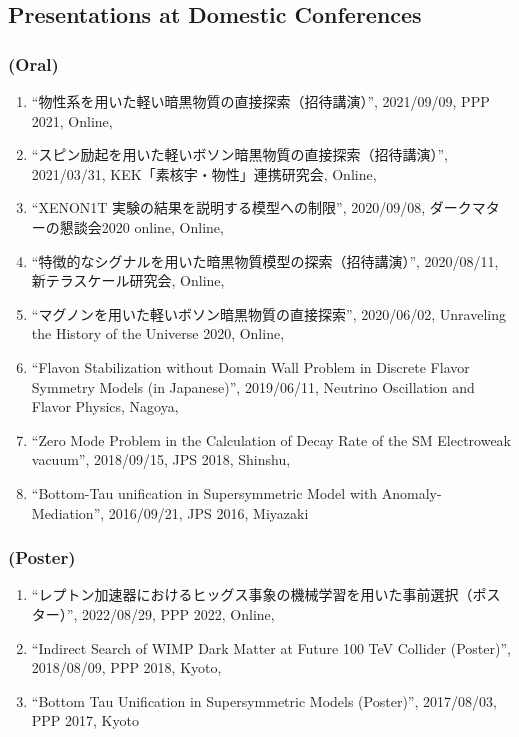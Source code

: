 \documentclass[12pt]{article}
\begin{document}
\subsection*{Presentations at Domestic Conferences}
\subsubsection*{(Oral)}
\begin{enumerate}
 \item ``物性系を用いた軽い暗黒物質の直接探索（招待講演）'', 2021/09/09, PPP 2021, Online,\item ``スピン励起を用いた軽いボソン暗黒物質の直接探索（招待講演）'', 2021/03/31, KEK「素核宇・物性」連携研究会, Online,\item ``XENON1T 実験の結果を説明する模型への制限'', 2020/09/08, ダークマターの懇談会2020 online, Online,\item ``特徴的なシグナルを用いた暗黒物質模型の探索（招待講演）'', 2020/08/11, 新テラスケール研究会, Online,\item ``マグノンを用いた軽いボソン暗黒物質の直接探索'', 2020/06/02, Unraveling the History of the Universe 2020, Online,\item ``Flavon Stabilization without Domain Wall Problem in Discrete Flavor Symmetry Models (in Japanese)'', 2019/06/11, Neutrino Oscillation and Flavor Physics, Nagoya,\item ``Zero Mode Problem in the Calculation of Decay Rate of the SM Electroweak vacuum'', 2018/09/15, JPS 2018, Shinshu,\item ``Bottom-Tau unification in Supersymmetric Model with Anomaly-Mediation'', 2016/09/21, JPS 2016, Miyazaki
\end{enumerate}
\subsubsection*{(Poster)}
\begin{enumerate}
 \item ``レプトン加速器におけるヒッグス事象の機械学習を用いた事前選択（ポスター）'', 2022/08/29, PPP 2022, Online,\item ``Indirect Search of WIMP Dark Matter at Future 100 TeV Collider (Poster)'', 2018/08/09, PPP 2018, Kyoto,\item ``Bottom Tau Unification in Supersymmetric Models (Poster)'', 2017/08/03, PPP 2017, Kyoto
\end{enumerate}

\end{document}
